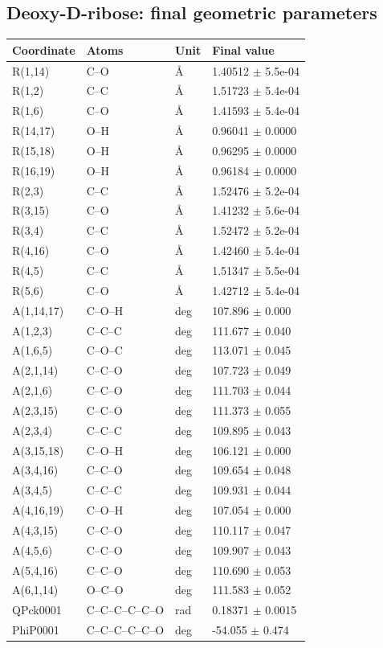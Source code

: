 \subsection{Deoxy-D-ribose: final geometric parameters}
\begin{landscape}
\scriptsize
\begin{longtable}{llll}
\toprule
Coordinate & Atoms & Unit & Final value \\
\midrule
\endhead
R(1,14) & C--O & \AA{} & 1.40512 $\pm$ 5.5e-04 \\
R(1,2) & C--C & \AA{} & 1.51723 $\pm$ 5.4e-04 \\
R(1,6) & C--O & \AA{} & 1.41593 $\pm$ 5.4e-04 \\
R(14,17) & O--H & \AA{} & 0.96041 $\pm$ 0.0000 \\
R(15,18) & O--H & \AA{} & 0.96295 $\pm$ 0.0000 \\
R(16,19) & O--H & \AA{} & 0.96184 $\pm$ 0.0000 \\
R(2,3) & C--C & \AA{} & 1.52476 $\pm$ 5.2e-04 \\
R(3,15) & C--O & \AA{} & 1.41232 $\pm$ 5.6e-04 \\
R(3,4) & C--C & \AA{} & 1.52472 $\pm$ 5.2e-04 \\
R(4,16) & C--O & \AA{} & 1.42460 $\pm$ 5.4e-04 \\
R(4,5) & C--C & \AA{} & 1.51347 $\pm$ 5.5e-04 \\
R(5,6) & C--O & \AA{} & 1.42712 $\pm$ 5.4e-04 \\
A(1,14,17) & C--O--H & deg & 107.896 $\pm$ 0.000 \\
A(1,2,3) & C--C--C & deg & 111.677 $\pm$ 0.040 \\
A(1,6,5) & C--O--C & deg & 113.071 $\pm$ 0.045 \\
A(2,1,14) & C--C--O & deg & 107.723 $\pm$ 0.049 \\
A(2,1,6) & C--C--O & deg & 111.703 $\pm$ 0.044 \\
A(2,3,15) & C--C--O & deg & 111.373 $\pm$ 0.055 \\
A(2,3,4) & C--C--C & deg & 109.895 $\pm$ 0.043 \\
A(3,15,18) & C--O--H & deg & 106.121 $\pm$ 0.000 \\
A(3,4,16) & C--C--O & deg & 109.654 $\pm$ 0.048 \\
A(3,4,5) & C--C--C & deg & 109.931 $\pm$ 0.044 \\
A(4,16,19) & C--O--H & deg & 107.054 $\pm$ 0.000 \\
A(4,3,15) & C--C--O & deg & 110.117 $\pm$ 0.047 \\
A(4,5,6) & C--C--O & deg & 109.907 $\pm$ 0.043 \\
A(5,4,16) & C--C--O & deg & 110.690 $\pm$ 0.053 \\
A(6,1,14) & O--C--O & deg & 111.583 $\pm$ 0.052 \\
QPck0001 & C--C--C--C--C--O & rad & 0.18371 $\pm$ 0.0015 \\
PhiP0001 & C--C--C--C--C--O & deg & -54.055 $\pm$ 0.474 \\
\bottomrule
\end{longtable}
\end{landscape}
